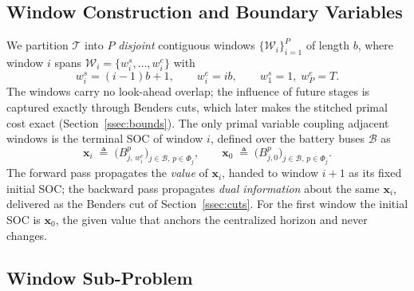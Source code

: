 \subsection{Window Construction and Boundary Variables}
\label{ssec:windows}

We partition $\mathcal{T}$ into $P$ \emph{disjoint} contiguous windows
$\{\mathcal{W}_i\}_{i=1}^{P}$ of length $b$, where window $i$ spans
$\mathcal{W}_i=\{w^{s}_i,\dots,w^{e}_i\}$ with
\begin{equation}
\label{eq:windows}
w^{s}_i = (i\!-\!1)b+1, \qquad w^{e}_i = ib,
\qquad w^{s}_1 = 1,\; w^{e}_P = T .
\end{equation}
The windows carry no look-ahead overlap; the influence of future stages
is captured exactly through Benders cuts, which later makes the stitched
primal cost exact (Section~\ref{ssec:bounds}). The only primal variable
coupling adjacent windows is the terminal SOC of window $i$, defined over
the battery buses $\mathcal{B}$ as
\begin{equation}
\label{eq:state_definition}
\bm{x}_i \;\triangleq\; \big(B^{p}_{j,\,w^{e}_i}\big)_{j\in\mathcal{B},\,p\in\Phi_j},
\qquad
\bm{x}_0 \;\triangleq\; \big(B^{p}_{j,0}\big)_{j\in\mathcal{B},\,p\in\Phi_j}.
\end{equation}
The forward pass propagates the \emph{value} of $\bm{x}_i$, handed to
window $i{+}1$ as its fixed initial SOC; the backward pass propagates
\emph{dual information} about the same $\bm{x}_i$, delivered as the
Benders cut of Section~\ref{ssec:cuts}. For the first window the initial
SOC is $\bm{x}_0$, the given value that anchors the centralized horizon
and never changes.

\subsection{Window Sub-Problem}
\label{ssec:subproblem}

